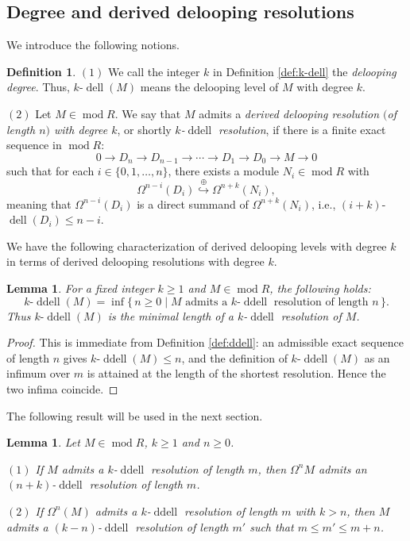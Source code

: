 \documentclass[12pt,a4paper,reqno]{amsart}
\theoremstyle{plain}
\newtheorem{lemma}[theorem]{Lemma}
\theoremstyle{definition}
\newtheorem{definition}[theorem]{Definition}
\theoremstyle{remark}
\DeclareMathOperator{\modd}{mod}
\DeclareMathOperator{\dell}{dell}
\DeclareMathOperator{\ddell}{ddell}
\newcommand{\oemb}{\stackrel{\oplus}{\hookrightarrow}}
\begin{document}
\subsection{Degree and derived delooping resolutions}\label{sec:derived-ddell}

We introduce the following notions.

\begin{definition}\label{def:classical-ddell}
$(1)$ We call the integer $k$ in Definition \ref{def:k-dell} the \emph{delooping degree}. Thus, $k\text{-}\dell(M)$ means the delooping level of $M$ with degree $k$.
 
$(2)$ Let $M \in \modd R$. We say that $M$ admits a \emph{derived delooping resolution $($of length $n$$)$ with degree $k$}, or shortly \emph{$k$-$\ddell$ resolution}, if there is a finite exact sequence in $\modd R$:
\[
0 \longrightarrow D_n \longrightarrow D_{n-1} \longrightarrow \cdots \longrightarrow D_1 \longrightarrow D_0 \longrightarrow M \longrightarrow 0
\]
such that for each $i \in \{0, 1, \ldots, n\}$, there exists a module $N_i \in \modd R$ with
\[
\Omega^{n-i}(D_i) \oemb \Omega^{n+k}(N_i),
\]
meaning that $\Omega^{n-i}(D_i)$ is a direct summand of $\Omega^{n+k}(N_i)$, i.e., $(i+k)$-$\dell(D_i)\le n-i$.
\end{definition}

We have the following characterization of derived delooping levels with degree $k$ in terms of derived delooping resolutions with degree $k$.

\begin{lemma}\label{lem:k-ddell}
For a fixed integer $k \ge 1$ and $M \in \modd R$, the following holds:
\[
k\text{-}\ddell(M) = \inf\{\, n \ge 0 \mid \text{\(M\) admits a \(k\)-\(\ddell\) resolution of length \(n\)} \,\}.
\]
Thus $k\text{-}\ddell(M)$ is the minimal length of a $k$-$\ddell$ resolution of $M$.
\end{lemma}

\begin{proof}
This is immediate from Definition \ref{def:ddell}: an admissible exact sequence of length $n$ gives $k\text{-}\ddell(M)\le n$, and the definition of $k\text{-}\ddell(M)$ as an infimum over $m$ is attained at the length of the shortest resolution. Hence the two infima coincide.
\end{proof}

The following result will be used in the next section.

\begin{lemma}\label{lem:syz-k-ddell} 
Let $M \in \modd R$, $k \ge 1$ and $n\ge 0$.

$(1)$ If $M$ admits a \(k\)-\(\ddell\) resolution of length \(m\), then $\Omega^{n}M$ admits an \((n+k)\)-\(\ddell\) resolution of length \(m\).

$(2)$ If $\Omega^{n}(M)$ admits a \(k\)-\(\ddell\) resolution of length \(m\) with $k>n$, then $M$ admits a \((k-n)\)-\(\ddell\) resolution of length \(m'\) such that \(m\le m'\le m+n\).
\end{lemma}
\end{document}
